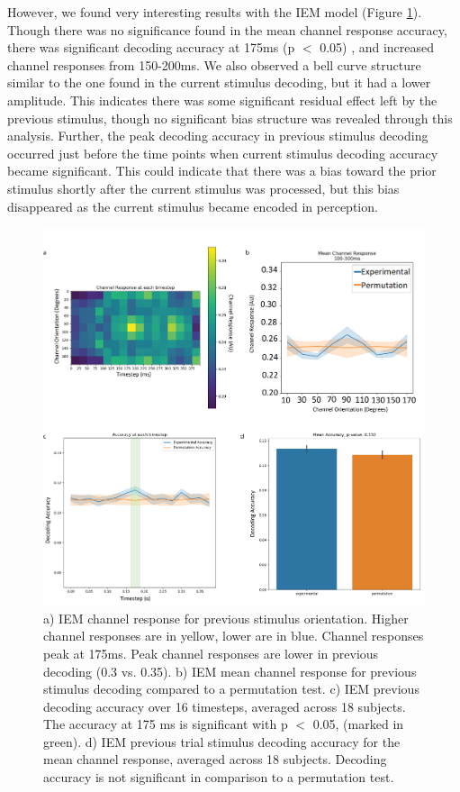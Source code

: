\documentclass[../main.tex]{subfiles}
\begin{document}
However, we found very interesting results with the IEM model (Figure \ref{iem_results_prev}). Though there was no significance found in the mean channel response accuracy, there was significant decoding accuracy at 175ms (p $<$ 0.05) , and increased channel responses from 150-200ms. We also observed a bell curve structure similar to the one found in the current stimulus decoding, but it had a lower amplitude. This indicates there was some significant residual effect left by the previous stimulus, though no significant bias structure was revealed through this analysis. Further, the peak decoding accuracy in previous stimulus decoding occurred just before the time points when current stimulus decoding accuracy became significant. This could indicate that there was a bias toward the prior stimulus shortly after the current stimulus was processed, but this bias disappeared as the current stimulus became encoded in perception.

\begin{figure}
    \centering
    \includegraphics[scale=0.7]{figures/results/iem_results_prev.png}
    \caption{a) IEM channel response for previous stimulus orientation. Higher channel responses are in yellow, lower are in blue. Channel responses peak at 175ms. Peak channel responses are lower in previous decoding (0.3 vs. 0.35). b) IEM mean channel response for previous stimulus decoding compared to a permutation test. c) IEM previous decoding accuracy over 16 timesteps, averaged across 18 subjects. The accuracy at 175 ms is significant with p $<$ 0.05, (marked in green). d) IEM previous trial stimulus decoding accuracy for the mean channel response, averaged across 18 subjects. Decoding accuracy is not significant in comparison to a permutation test.}
    \label{iem_results_prev}
\end{figure}
\end{document}

